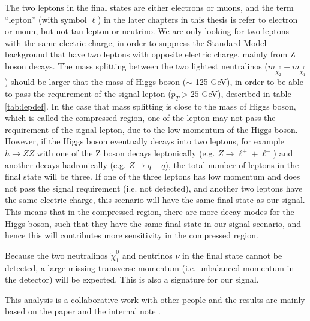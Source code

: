 The two leptons in the final states are either electrons or muons, and the term ``lepton'' (with symbol $\ell$) in the later chapters in this thesis is refer to electron or moun, but not tau lepton or neutrino.
We are only looking for two leptons with the same electric charge, in order to suppress the Standard Model background that have two leptons with opposite electric charge, mainly from Z boson decays.
The mass splitting between the two lightest neutralinos ($m_{\tilde{\chi}_2^0} - m_{\tilde{\chi}_1^0}$) should be larger that the mass of Higgs boson ($\sim$ 125 GeV), in order to be able to pass the requirement of the signal lepton ($p_T > 25$ GeV), described in table \ref{tab:lepdef}.
In the case that mass splitting is close to the mass of Higgs boson, which is called the compressed region, one of the lepton may not pass the requirement of the signal lepton, due to the low momentum of the Higgs boson.
However, if the Higgs boson eventually decays into two leptons, for example $h \rightarrow ZZ$ with one of the Z boson decays leptonically (e.g. $Z \rightarrow \ell^{+} + \ell^{-}$) and another decays hadronically (e.g. $Z \rightarrow q + q$), the total number of leptons in the final state will be three.
If one of the three leptons has low momentum and does not pass the signal requirement (i.e. not detected), and another two leptons have the same electric charge, this scenario will have the same final state as our signal.
This means that in the compressed region, there are more decay modes for the Higgs boson, such that they have the same final state in our signal scenario, and hence this will contributes more sensitivity in the compressed region.

Because the two neutralinos $\tilde{\chi}_1^0$ and neutrinos $\nu$ in the final state cannot be detected, a large missing transverse momentum (i.e. unbalanced momentum in the detector) will be expected.
This is also a signature for our signal.

This analysis is a collaborative work with other people and the results are mainly based on the paper \cite{Wh} and the internal note \cite{WhSS}.
